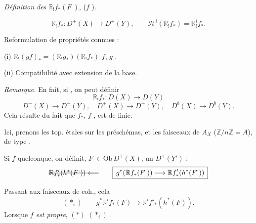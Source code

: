 \documentclass[11pt,a4paper]{article}
\begin{document}

\emph{Définition des} $\mathbb{R}_! f_*(F^\cdot)$, ($f$ \ill{}).


\[
\mathbb{R}_! f_* : D^+(X) \longrightarrow D^+(Y), \qquad
\mathcal{H}^i(\mathbb{R}_! f_*) = \mathbb{R}^i_! f_* .
\]

Reformulation de propriétés connues :

(i) $\mathbb{R}_!(gf)_* = (\mathbb{R}_! g_*)(\mathbb{R}_! f_*)$
 $f$, $g$ \ill{}  \ill{}
.

(ii) Compatibilité avec extension de la base.

\emph{Remarque.} En fait, si  , on peut définir
\[
\mathbb{R}_! f_* : D(X) \longrightarrow D(Y)
\]
\[
D^-(X) \longrightarrow D^-(Y), \quad D^+(X) \to D^+(Y), \quad
D^b(X) \longrightarrow D^b(Y).
\]
Cela résulte du fait que $f_*$,  $f$ \ill{}  , est de  finie.

Ici, prenons les top. étales sur les préschémas, et les faisceaux de
$A_X$ ($\mathbb{Z}/n\mathbb{Z} = A$), \ill{} \ill{} \ill{} \ill{} de type
\ill{} \ill{} \ill{} \ill{} .


Si $f$ quelconque, on définit,  $F^\cdot \in \mathrm{Ob}\, D^+(X)$,
un  \ill{}  $D^+(Y')$ :
\[
\text{\struck{$\mathbb{R} f'_*(h^*(F^\cdot)) \longleftarrow$}}
\qquad
\boxed{\,g^*(\mathbb{R} f_*(F^\cdot)) \longrightarrow \mathbb{R} f'_*(h^*(F^\cdot))\,}
\]

Passant aux faisceaux de coh., cela 
\[
(*_i) \qquad g^* \mathbb{R}^i f_*(F) \longrightarrow \mathbb{R}^i f'_*(h^*(F)).
\]
Lorsque \emph{$f$ est propre}, \ill{} $(*)$ \ill{} \ill{} \ill{}
 $(*_i)$ \ill{} \ill{}.
\end{document}
